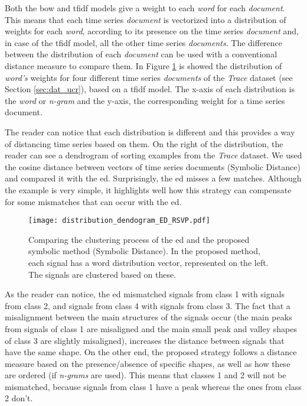 Both the \gls{bow} and \gls{tfidf} models give a weight to each \textit{word} for each \textit{document}. This means that each time series \textit{document} is vectorized into a distribution of weights for each \textit{word}, according to its presence on the time series \textit{document} and, in case of the \gls{tfidf} model, all the other time series \textit{documents}. The difference between the distribution of each \textit{document} can be used with a conventional distance measure to compare them. In Figure \ref{fig:distribution_dendogram} is showed the distribution of \textit{word's} weights for four different time series \textit{documents} of the \textit{Trace} dataset (see Section \ref{sec:dat_ucr}), based on a \gls{tfidf} model. The x-axis of each distribution is the \textit{word} or \textit{n-gram} and the y-axis, the corresponding weight for a time series document.
\par
The reader can notice that each distribution is different and this provides a way of distancing time series based on them. On the right of the distribution, the reader can see a dendrogram of sorting examples from the \textit{Trace} dataset. We used the cosine distance between vectors of time series documents (Symbolic Distance) and compared it with the \gls{ed}. Surprisingly, the \gls{ed} misses a few matches. Although the example is very simple, it highlights well how this strategy can compensate for some mismatches that can occur with the \gls{ed}.

\begin{figure}
    \centering
    \texttt{[image: distribution\_dendogram\_ED\_RSVP.pdf]}
    \caption{Comparing the clustering process of the \gls{ed} and the proposed symbolic method (Symbolic Distance). In the proposed method, each signal has a word distribution vector, represented on the left. The signals are clustered based on these.}
    \label{fig:distribution_dendogram}
\end{figure}
 
As the reader can notice, the \gls{ed} mismatched signals from class 1 with signals from class 2, and signals from class 4 with signals from class 3. The fact that a misalignment between the main structures of the signals occur (the main peaks from signals of class 1 are misaligned and the main small peak and valley shapes of class 3 are slightly misaligned), increases the distance between signals that have the same shape. On the other end, the proposed strategy follows a distance measure based on the presence/absence of specific shapes, as well as how these are ordered (if \textit{n-grams} are used). This means that classes 1 and 2 will not be mismatched, because signals from class 1 have a peak whereas the ones from class 2 don't.

